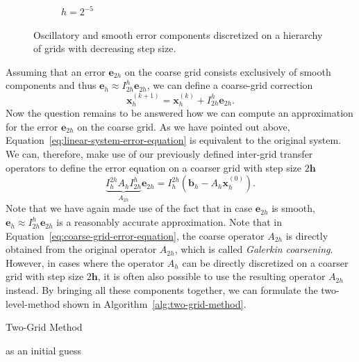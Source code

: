 \begin{figure}[t]
\begin{subfigure}[b]{0.32\textwidth}
		\caption{$h = 2^{-5}$}
	\end{subfigure}
	\caption[Oscillatory and smooth error components discretized on a hierarchy of grids with decreasing step size]{Oscillatory and smooth error components discretized on a hierarchy of grids with decreasing step size.}
	\label{fig:error-on-multiple-levels}
\end{figure}
Assuming that an error $\bm{e}_{2h}$ on the coarse grid consists exclusively of smooth components and thus $\bm{e}_{h} \approx I_{2h}^{h} \bm{e}_{2h}$, we can define a coarse-grid correction 
\begin{equation}
	\bm{x}^{(k+1)}_h = \bm{x}^{(k)}_h + I_{2h}^h \bm{e}_{2h}.
\end{equation} 
Now the question remains to be answered how we can compute an approximation for the error $\bm{e}_{2h}$ on the coarse grid.
As we have pointed out above, Equation~\eqref{eq:linear-system-error-equation} is equivalent to the original system.
We can, therefore, make use of our previously defined inter-grid transfer operators to define the error equation on a coarser grid with step size $2\bm{h}$
\begin{equation}
	\underbrace{I_{h}^{2h} A_h I_{2h}^h}_{A_{2h}} \bm{e}_{2h} = I_{h}^{2h} \left(\bm{b}_h - A_h \bm{x}^{(0)}_h\right).
	\label{eq:coarse-grid-error-equation}
\end{equation}
Note that we have again made use of the fact that in case $\bm{e}_{2h}$ is smooth, $\bm{e}_{h} \approx I_{2h}^{h} \bm{e}_{2h}$ is a reasonably accurate approximation.
Note that in Equation~\eqref{eq:coarse-grid-error-equation}, the coarse operator $A_{2h}$ is directly obtained from the original operator $A_{2h}$, which is called \emph{Galerkin coarsening}.
However, in cases where the operator $A_h$ can be directly discretized on a coarser grid with step size $2\bm{h}$, it is often also possible to use the resulting operator $A_{2h}$ instead.
By bringing all these components together, we can formulate the two-level-method shown in Algorithm~\ref{alg:two-grid-method}.
\begin{algorithm}
	\caption{Two-Grid Method}
	\label{alg:two-grid-method}
	\begin{algorithmic}
		 as an initial guess
	\end{algorithmic}
\end{algorithm}
